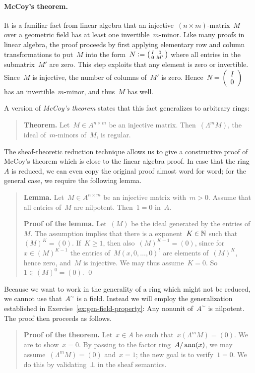 \documentclass{ws-rv9x6}
\begin{document}
{\paragraph{McCoy's theorem.}\label{par:mccoy}
It is a familiar fact from linear algebra that an injective~$(n \times
m)$-matrix~$M$ over a geometric field has at least one invertible~$m$-minor.
Like many proofs in linear algebra, the proof proceeds by first applying
elementary row and column transformations to put~$M$ into the form~$N \vcentcolon=
\left(\begin{smallmatrix}I&0\\0&M'\end{smallmatrix}\right)$ where all entries
in the submatrix~$M'$ are zero. This step exploits
that any element is zero or invertible. Since~$M$ is injective, the number of columns of~$M'$ is zero.
Hence~$N = \left(\begin{smallmatrix}I\\0\end{smallmatrix}\right)$ has an
invertible~$m$-minor, and thus~$M$ has well.

A version of \emph{McCoy's theorem} states that this fact
generalizes to arbitrary rings:

\begin{quote}
\textbf{Theorem.} Let~$M \in A^{n \times m}$ be an injective matrix.
Then~$(\Lambda^m M)$, the ideal of~$m$-minors of~$M$, is regular.
\end{quote}

The sheaf-theoretic reduction technique allows us to give a constructive proof
of McCoy's theorem which is close to the linear algebra proof. In case that the
ring~$A$ is reduced, we can even copy the original proof almost word for word;
for the general case, we require the following lemma.

\begin{quote}
\textbf{Lemma.} Let~$M \in A^{n \times m}$ be an injective matrix with~$m > 0$. Assume that all entries
of~$M$ are nilpotent. Then~$1 = 0$ in~$A$.

\textbf{Proof of the lemma.} Let~$(M)$ be the ideal generated by the entries
of~$M$. The assumption implies that there is a exponent~$K \in \mathbb{N}$ such that~$(M)^K = (0)$.
If~$K \geq 1$, then also~$(M)^{K-1} = (0)$, since for~$x \in (M)^{K-1}$ the
entries of~$M (x,0,\ldots,0)^t$ are elements of~$(M)^K$, hence zero,
and~$M$ is injective. We may thus assume~$K = 0$. So~$1 \in (M)^0 = (0)$. \qed
\end{quote}
Because we want to work in the generality of
a ring which might not be reduced, we cannot use that~$A^\sim$ is a field.
Instead we will employ the generalization established in
Exercise~\ref{ex:gen-field-property}: Any nonunit of~$A^\sim$ is nilpotent. The
proof then proceeds as follows.\par
\begin{quote}
\textbf{Proof of the theorem.} Let~$x \in A$ be such that~$x (\Lambda^m M) = (0)$. We are to
show~$x = 0$. By passing to the factor ring~$A/\operatorname{ann}(x)$, we may
assume~$(\Lambda^m M) = (0)$ and~$x = 1$; the new goal is to verify~$1 = 0$. We
do this by validating~$\bot$ in the sheaf semantics.


\end{quote}}
\end{document}
